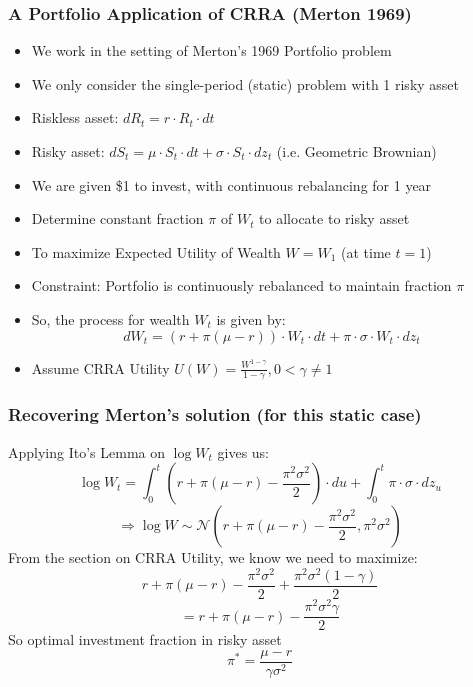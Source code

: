 \documentclass[handout]{beamer}
\begin{document}
\begin{frame}
\frametitle{A Portfolio Application of CRRA (Merton 1969)}
\pause
\begin{itemize}[<+->]
\item We work in the setting of Merton's 1969 Portfolio problem
\item We only consider the single-period (static) problem with 1 risky asset
\item Riskless asset: $dR_t = r \cdot R_t \cdot dt$
\item Risky asset: $dS_t = \mu \cdot S_t \cdot dt + \sigma \cdot S_t \cdot dz_t$ (i.e. Geometric Brownian)
\item We are given \$1 to invest, with continuous rebalancing for 1 year
\item Determine constant fraction $\pi$ of $W_t$ to allocate to risky asset
\item To maximize Expected Utility of Wealth $W = W_1$ (at time $t=1$)
\item Constraint: Portfolio is continuously rebalanced to maintain fraction $\pi$
\item So, the process for wealth $W_t$ is given by:
$$dW_t = (r + \pi (\mu - r)) \cdot W_t \cdot dt + \pi \cdot \sigma \cdot W_t \cdot dz_t$$
\item Assume CRRA Utility $U(W) = \frac {W^{1-\gamma}} {1-\gamma}, 0 < \gamma \neq 1$
\end{itemize}
\end{frame}

\begin{frame}
\frametitle{Recovering Merton's solution (for this static case)}
\pause
Applying Ito's Lemma on $\log W_t$ gives us:
$$\log W_t = \int_0^t (r + \pi (\mu - r) - \frac {\pi^2 \sigma^2} 2) \cdot du + \int_0^t \pi \cdot \sigma \cdot dz_u$$
\pause
$$\Rightarrow \log W \sim \mathcal{N}(r+\pi(\mu -r) - \frac {\pi^2 \sigma^2} 2,  \pi^2 \sigma^2)$$
\pause
From the section on CRRA Utility, we know we need to maximize:
$$r+\pi(\mu -r) - \frac {\pi^2 \sigma^2} 2 + \frac {\pi^2 \sigma^2 (1-\gamma)} 2$$
\pause
$$= r + \pi(\mu - r) - \frac {\pi^2 \sigma^2 \gamma} 2$$
\pause
So optimal investment fraction in risky asset
$$\pi^* = \frac {\mu - r} {\gamma \sigma^2}$$
\end{frame}
\end{document}

